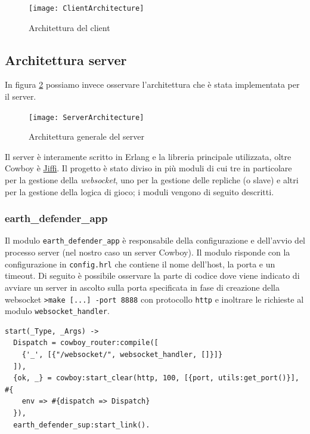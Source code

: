 \documentclass[paper=a4, fontsize=11pt]{scrartcl} %
\numberwithin{equation}{section} %
\numberwithin{figure}{section} %
\numberwithin{table}{section} %
\begin{document}
\begin{figure}
\centering
\texttt{[image: ClientArchitecture]}
\caption{Architettura del client}
\label{ClientArc}
\end{figure}

\subsection{Architettura server}
In figura \ref{ServerArc} possiamo invece osservare l'architettura che è stata implementata per il server.

\begin{figure}
\centering
\texttt{[image: ServerArchitecture]}
\caption{Architettura generale del server}
\label{ServerArc}
\end{figure}

Il server è interamente scritto in Erlang e la libreria principale utilizzata, oltre Cowboy è \href{https://github.com/davisp/jiffy}{Jiffi}. Il progetto è stato diviso in più moduli di cui tre in particolare per la gestione della \textit{websocket}, uno per la gestione delle repliche (o slave) e altri per la gestione della logica di gioco; i moduli vengono di seguito descritti.
\subsubsection{earth\_defender\_app}
Il modulo \texttt{earth\_defender\_app} è responsabile della configurazione e dell'avvio del processo server (nel nostro caso un server Cowboy). Il modulo risponde con la configurazione in \texttt{config.hrl} che contiene il nome dell'host, la porta e un timeout.
Di seguito è possibile osservare la parte di codice dove viene indicato di avviare un server in ascolto sulla porta specificata in fase di creazione della websocket \texttt{>make [...] -port 8888} con protocollo \texttt{http} e inoltrare le richieste al modulo \texttt{websocket\_handler}.
\begin{lstlisting}[basicstyle=\footnotesize]
start(_Type, _Args) ->
  Dispatch = cowboy_router:compile([
    {'_', [{"/websocket/", websocket_handler, []}]}
  ]),
  {ok, _} = cowboy:start_clear(http, 100, [{port, utils:get_port()}], #{
    env => #{dispatch => Dispatch}
  }),
  earth_defender_sup:start_link().
\end{lstlisting}
\end{document}
